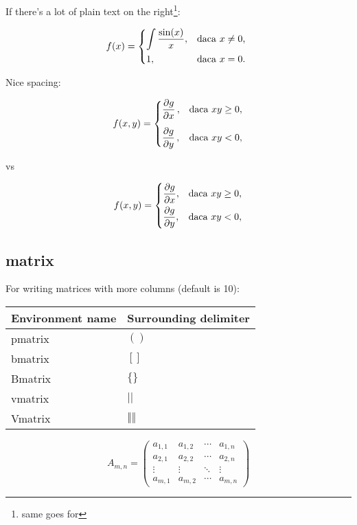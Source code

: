 If there's a lot of plain text on the right\footnote{same goes for }:\\
\begin{example}
\[f(x) =
  \begin{dcases*}
    \int \frac{\sin(x)}{x},&daca $x \neq 0$,\\
    1,& daca $x=0$.
  \end{dcases*}
\]
\end{example}


\newcommand{\parti}[2]{\frac{\partial #1}{\partial #2}}
Nice spacing:\\
\begin{example}
\[f(x, y) =
\begin{dcases}
\parti{g}{x}\,,&\text{daca } x y \geq 0,\\[.5em]
\parti{g}{y}\,,&\text{daca } x y < 0,
\end{dcases}
\]
\end{example}

vs\\
\begin{example}
\[f(x, y) =
\begin{dcases}
 \parti{g}{x},&\text{daca } x y \geq 0,\\
 \parti{g}{y},&\text{daca } x y < 0,
\end{dcases}
\]
\end{example}



\subsection{matrix}
For writing matrices with more columns (default is 10):
\code{\setcounter{MaxMatrixCols}{15}}

\begin{tabular}{|l|l|}
  \hline
  Environment name & Surrounding delimiter\\
  \hline
pmatrix & $( )$\\
bmatrix & $[ ]$\\
Bmatrix & $\{ \}$\\
vmatrix & $| |$\\
Vmatrix & $\Vert \Vert$\\
  \hline
\end{tabular}

\begin{example}
\[
A_{m,n} = 
 \begin{pmatrix}
  a_{1,1} & a_{1,2} & \cdots & a_{1,n} \\
  a_{2,1} & a_{2,2} & \cdots & a_{2,n} \\
  \vdots  & \vdots  & \ddots & \vdots  \\
  a_{m,1} & a_{m,2} & \cdots & a_{m,n} 
\end{pmatrix}
\]
\end{example}

